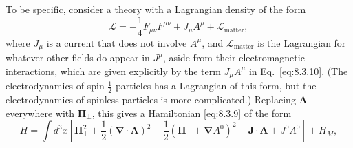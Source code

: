 To be specific, consider a theory with a Lagrangian density of the form
\begin{equation}
  \mathcal L=-\frac14F_{\mu\nu}F^{\mu\nu}+J_\mu A^\mu
  +\mathcal L_{\mathrm{matter}},
  \tag{8.3.10}\label{eq:8.3.10}
\end{equation}
where $J_\mu$ is a current that does not involve $A^\mu$, and
$\mathcal L_{\mathrm{matter}}$ is the Lagrangian for whatever other fields do
appear in $J^\mu$, aside from their electromagnetic interactions, which are
given explicitly by the term $J_\mu A^\mu$ in Eq.~\eqref{eq:8.3.10}. (The
electrodynamics of spin $\tfrac12$ particles has a Lagrangian of this form,
but the electrodynamics of spinless particles is more complicated.) Replacing
$\dot{\mathbf A}$ everywhere with $\boldsymbol\Pi_\perp$, this gives a
Hamiltonian \eqref{eq:8.3.9} of the form
\[
  H=\int d^3x\left[
  \boldsymbol\Pi_\perp^2
  +\frac12(\boldsymbol\nabla\cdot\mathbf A)^2
  -\frac12(\boldsymbol\Pi_\perp+\boldsymbol\nabla A^0)^2
  -\mathbf J\cdot\mathbf A+J^0A^0\right]+H_M,
\]
